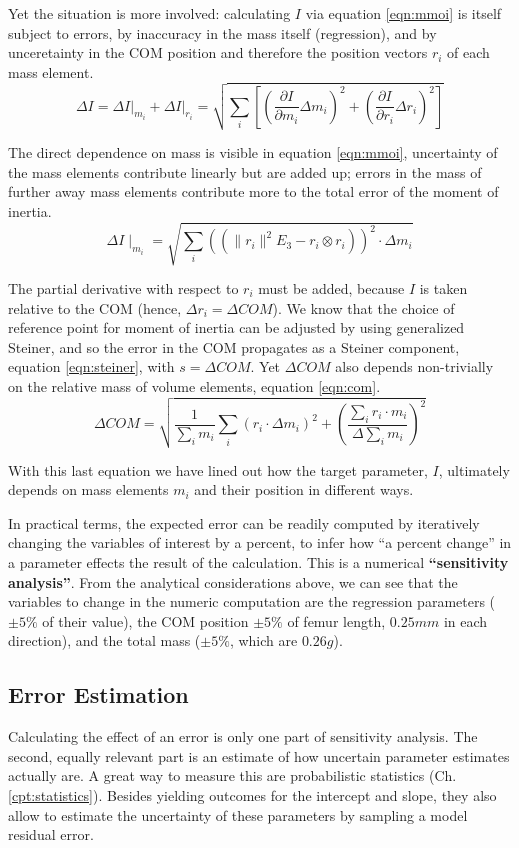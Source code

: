Yet the situation is more involved: calculating \(I\) via equation \eqref{eqn:mmoi} is itself subject to errors, by inaccuracy in the mass itself (regression), and by unceretainty in the COM position and therefore the position vectors \(r_{i}\) of each mass element.
\[ \Delta I = \left. \Delta I \right|_{m_i} + \left. \Delta I \right|_{r_i} = \sqrt{ \sum_{i} \left[ \left(\frac{\partial I}{\partial m_{i}} \Delta m_{i} \right)^2 + \left(\frac{\partial I}{\partial r_{i}} \Delta r_{i}\right)^2 \right] }\]


The direct dependence on mass is visible in equation \eqref{eqn:mmoi}, uncertainty of the mass elements contribute linearly but are added up; errors in the mass of further away mass elements contribute more to the total error of the moment of inertia.
\[ \Delta I \mid_{m_i} = \sqrt{\sum\limits_{i}\left(\left( \lVert r_{i} \rVert ^2 E_3 - r_{i} \otimes r_{i} \right)\right)^2 \cdot \Delta m_{i} }\]


The partial derivative with respect to \(r_{i}\) must be added, because \(I\) is taken relative to the COM (hence, \(\Delta r_i = \Delta COM\)).
We know that the choice of reference point for moment of inertia can be adjusted by using generalized Steiner, and so the error in the COM propagates as a Steiner component, equation \eqref{eqn:steiner}, with \(s=\Delta COM\).
Yet \(\Delta COM\) also depends non-trivially on the relative mass of volume elements, equation \eqref{eqn:com}.
\[ \Delta COM = \sqrt{ \frac{1}{\sum_i m_{i}} \sum\limits_{i} \left( r_{i} \cdot \Delta m_{i} \right)^2  + \left( \frac{ \sum\limits_{i} r_{i} \cdot m_{i} }{\Delta \sum_i m_{i} }\right)^{2}}\]


With this last equation we have lined out how the target parameter, \(I\), ultimately depends on mass elements \(m_{i}\) and their position in different ways.


In practical terms, the expected error can be readily computed by iteratively changing the variables of interest by a percent, to infer how ``a percent change'' in a parameter effects the result of the calculation.
This is a numerical \textbf{``sensitivity analysis''}.
From the analytical considerations above, we can see that the variables to change in the numeric computation are the regression parameters (\(\pm 5\%\) of their value), the COM position \(\pm 5\%\) of femur length, \(0.25 mm\) in each direction), and the total mass (\(\pm 5\%\), which are \(0.26 g\)).


\subsection{Error Estimation}
\label{sec:org5e8e546}
Calculating the effect of an error is only one part of sensitivity analysis.
The second, equally relevant part is an estimate of how uncertain parameter estimates actually are.
A great way to measure this are probabilistic statistics (Ch. \ref{cpt:statistics}).
Besides yielding outcomes for the intercept and slope, they also allow to estimate the uncertainty of these parameters by sampling a model residual error.


